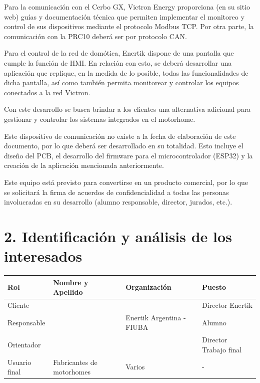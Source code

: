 \documentclass[
11pt, %
]{charter}
\begin{document}
Para la comunicación con el Cerbo GX, Victron Energy proporciona (en su sitio web) guías y documentación técnica que permiten implementar el monitoreo y control de sus dispositivos mediante el protocolo Modbus TCP. Por otra parte, la comunicación con la PRC10 deberá ser por protocolo CAN.

Para el control de la red de domótica, Enertik dispone de una pantalla que cumple la función de HMI. En relación con esto, se deberá desarrollar una aplicación que replique, en la medida de lo posible, todas las funcionalidades de dicha pantalla, así como también permita monitorear y controlar los equipos conectados a la red Victron.

Con este desarrollo se busca brindar a los clientes una alternativa adicional para gestionar y controlar los sistemas integrados en el motorhome.

Este dispositivo de comunicación no existe a la fecha de elaboración de este documento, por lo que deberá ser desarrollado en su totalidad. Esto incluye el diseño del PCB, el desarrollo del firmware para el microcontrolador (ESP32) y la creación de la aplicación mencionada anteriormente.

Este equipo está previsto para convertirse en un producto comercial, por lo que se solicitará la firma de acuerdos de confidencialidad a todas las personas involucradas en su desarrollo (alumno responsable, director, jurados, etc.).

\section{2. Identificación y análisis de los interesados}
\label{sec:interesados}

\begin{table}[ht]
\begin{tabularx}{\linewidth}{@{}|l|X|X|l|@{}}
\hline
\rowcolor[HTML]{C0C0C0} 
Rol           & Nombre y Apellido 		& Organización 	& Puesto 	\\ \hline
Cliente       & \clientename  		  &\empclientename	& Director Enertik    \\ \hline
Responsable   & \authorname     		  & Enertik Argentina - FIUBA        	& Alumno 	\\ \hline
Orientador    & \supname     		 & \pertesupname 	& Director Trabajo final \\ \hline
Usuario final & Fabricantes de motorhomes & Varios    	& -       	\\ \hline
\end{tabularx}
\end{table}
\end{document}
